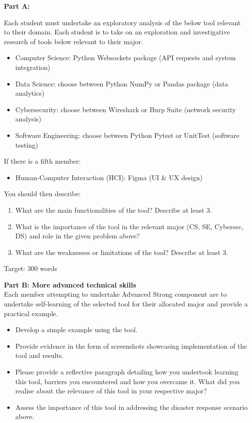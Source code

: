 \documentclass[a4paper, 11pt]{report}
\begin{document}
\vspace{2ex}


\textbf{Part A:}

Each student must undertake an exploratory analysis of the below tool relevant to their domain. 
Each student is to take on an exploration and investigative research of tools below relevant to their major. 

\begin{itemize}
    \item Computer Science: Python Websockets package (API requests and system integration)
    \item Data Science: choose between Python NumPy or Pandas package (data analytics)
    \item Cybersecurity: choose between Wireshark or Burp Suite (network security analysis)
    \item Software Engineering: choose between Python Pytest or UnitTest (software testing)
\end{itemize}
If there is a fifth member:
\begin{itemize}
    \item Human-Computer Interaction (HCI): Figma (UI \& UX design)
\end{itemize}

\vspace{4ex}

You should then describe:
\begin{enumerate}
    \item What are the main functionalities of the tool? Describe at least 3.
    \item What is the importance of the tool in the relevant major (CS, SE, Cybersec, DS) and role in the given problem above?
    \item What are the weaknesses or limitations of the tool? Describe at least 3.
\end{enumerate}
Target: 300 words

\vspace{4ex}

\textbf{Part B: More advanced technical skills}\\

Each member attempting to undertake Advanced Strong component are to undertake self-learning of the selected tool for their allocated major and provide a practical example.

\begin{itemize}
    \item Develop a simple example using the tool.
    \item Provide evidence in the form of screenshots showcasing implementation of the tool and results.
    \item Please provide a reflective paragraph detailing how you undertook learning this tool, barriers you encountered and how you overcame it. What did you realise about the relevance of this tool in your respective major?
    \item Assess the importance of this tool in addressing the disaster response scenario above.
\end{itemize}
\end{document}
